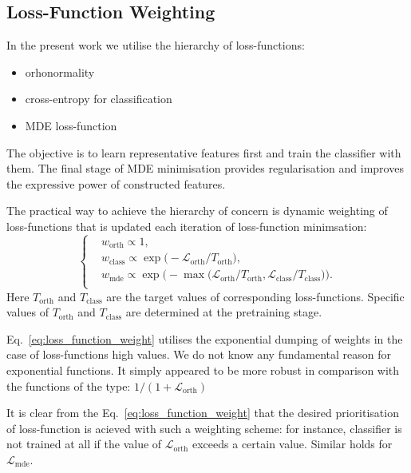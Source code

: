 \documentclass{article}
\theoremstyle{plain}
\theoremstyle{definition}
\theoremstyle{remark}
\begin{document}
\subsection{Loss-Function Weighting}
\label{subsec:loss_function_weigting}
In the present work we utilise the hierarchy of loss-functions:
\begin{itemize}
    \item orhonormality
    \item cross-entropy for classification
    \item MDE loss-function
\end{itemize}
The objective is to learn representative features first and train the classifier with them.
The final stage of MDE minimisation provides regularisation and improves the expressive power of constructed features.

The practical way to achieve the hierarchy of concern is dynamic weighting of loss-functions that is updated
each iteration of loss-function minimsation:
\begin{equation}
    \label{eq:loss_function_weight}
        \begin{cases}
            & w_{\text{orth}} \propto 1, \\
            & w_{\text{class}} \propto \exp\bigg( - \mathcal{L}_{\text{orth}} / T_{\text{orth}}\bigg), \\
            & w_{\text{mde}} \propto \exp\bigg( - \max\Big(\mathcal{L}_{\text{orth}} / T_{\text{orth}}, \mathcal{L}_{\text{class}} / T_{\text{class}}\Big) \bigg). \\
        \end{cases}
\end{equation}
Here $T_{\text{orth}}$ and $T_{\text{class}}$ are the target values of corresponding loss-functions.
Specific values of $T_{\text{orth}}$ and $T_{\text{class}}$ are determined at the pretraining stage.

Eq.~\eqref{eq:loss_function_weight} utilises the exponential dumping of weights in the case of loss-functions high values.
We do not know any fundamental reason for exponential functions.
It simply appeared to be more robust in comparison with the functions of the type: $1 / (1 + \mathcal{L}_{\text{orth}})$

It is clear from the Eq.~\eqref{eq:loss_function_weight} that the desired prioritisation of loss-function is acieved
with such a weighting scheme: for instance, classifier is not trained at all if the value of $\mathcal{L}_{\text{orth}}$
exceeds a certain value. Similar holds for $\mathcal{L}_{\text{mde}}$.
\end{document}
